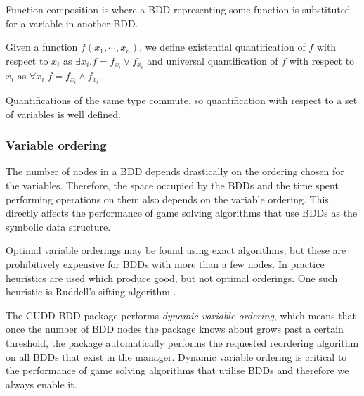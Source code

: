 Function composition is where a BDD representing some function is substituted for a variable in another BDD.

Given a function $f(x_1,\cdots,x_n)$, we define existential quantification of $f$ with respect to $x_i$ as $\exists x_i. f = f_{x_i} \vee f_{\overline{x_i}}$ and universal quantification of $f$ with respect to $x_i$ as $\forall x_i. f = f_{x_i} \wedge f_{\overline{x_i}}$.

Quantifications of the same type commute, so quantification with respect to a set of variables is well defined. 

\subsubsection{Variable ordering}

The number of nodes in a BDD depends drastically on the ordering chosen for the variables. Therefore, the space occupied by the BDDs and the time spent performing operations on them also depends on the variable ordering. This directly affects the performance of game solving algorithms that use BDDs as the symbolic data structure. 

Optimal variable orderings may be found using exact algorithms, but these are prohibitively expensive for BDDs with more than a few nodes. In practice heuristics are used which produce good, but not optimal orderings. One such heuristic is Ruddell's sifting algorithm \cite{sifting}.

The CUDD BDD package performs \emph{dynamic variable ordering}, which means that once the number of BDD nodes the package knows about grows past a certain threshold, the package automatically performs the requested reordering algorithm on all BDDs that exist in the manager. Dynamic variable ordering is critical to the performance of game solving algorithms that utilise BDDs and therefore we always enable it.

